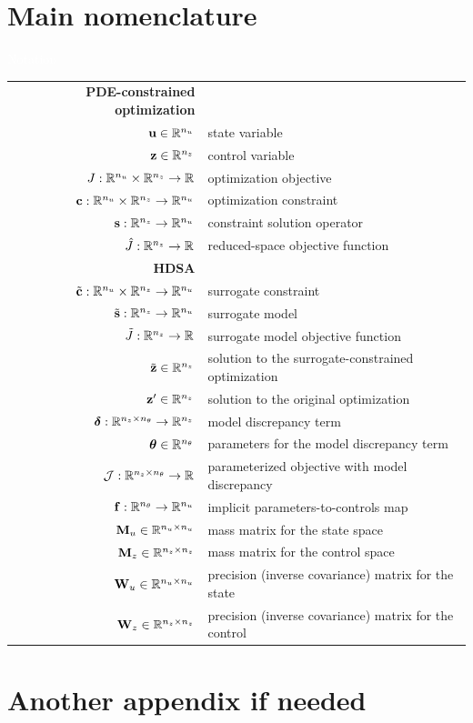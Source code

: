 \section{Main nomenclature}

\textcolor{white}{Notation}
\begin{tabular}{rl}
    \textbf{PDE-constrained optimization} \\
    $\mathbf{u} \in \mathbb{R}^{n_u}$ & state variable \\
    $\mathbf{z} \in \mathbb{R}^{n_z}$ & control variable \\
    $J:\mathbb{R}^{n_u}\times\mathbb{R}^{n_z}\to\mathbb{R}$ & optimization objective \\
    $\mathbf{c}:\mathbb{R}^{n_u}\times\mathbb{R}^{n_z}\to\mathbb{R}^{n_u}$ & optimization constraint \\
    $\mathbf{s}:\mathbb{R}^{n_z}\to\mathbb{R}^{n_u}$ & constraint solution operator \\
    $\hat{J}:\mathbb{R}^{n_z}\to\mathbb{R}$ & reduced-space objective function
    \\[.0625in]

    \textbf{HDSA} \\
    $\tilde{\mathbf{c}}:\mathbb{R}^{n_u}\times\mathbb{R}^{n_z}\to\mathbb{R}^{n_u}$ & surrogate constraint \\
    $\tilde{\mathbf{s}}:\mathbb{R}^{n_z}\to\mathbb{R}^{n_u}$ & surrogate model \\
    $\tilde{J}:\mathbb{R}^{n_z}\to\mathbb{R}$ & surrogate model objective function \\
    $\tilde{\mathbf{z}}\in\mathbb{R}^{n_z}$ & solution to the surrogate-constrained optimization \\
    $\mathbf{z}'\in\mathbb{R}^{n_z}$ & solution to the original optimization \\
    $\boldsymbol{\delta}:\mathbb{R}^{n_z\times n_\theta}\to\mathbb{R}^{n_z}$ & model discrepancy term \\
    $\boldsymbol{\theta}\in\mathbb{R}^{n_\theta}$ & parameters for the model discrepancy term \\
    $\mathcal{J}:\mathbb{R}^{n_z\times n_\theta}\to\mathbb{R}$ & parameterized objective with model discrepancy \\
    $\mathbf{f}:\mathbb{R}^{n_\theta}\to\mathbb{R}^{n_u}$ & implicit parameters-to-controls map \\
    $\mathbf{M}_u\in\mathbb{R}^{n_u\times n_u}$ & mass matrix for the state space \\
    $\mathbf{M}_z\in\mathbb{R}^{n_z\times n_z}$ & mass matrix for the control space \\
    $\mathbf{W}_u\in\mathbb{R}^{n_u\times n_u}$ & precision (inverse covariance) matrix for the state \\
    $\mathbf{W}_z\in\mathbb{R}^{n_z\times n_z}$ & precision (inverse covariance) matrix for the control \\
\end{tabular}

    \section{Another appendix if needed}
